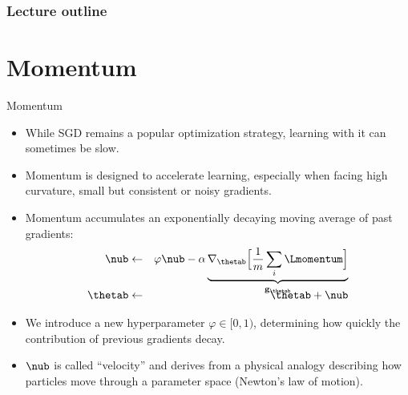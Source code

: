








\begin{frame}
\frametitle{Lecture outline}
\tableofcontents
\end{frame}

\section{Momentum}
\begin{vbframe}{Momentum}
  \begin{itemize}
    \item While SGD remains a popular optimization strategy, learning with it can sometimes be slow. 
    \item Momentum is designed to accelerate learning, especially when facing high curvature, small but consistent or noisy gradients.
    \item Momentum accumulates an exponentially decaying moving average of past gradients:
      \begin{eqnarray*} 
        \nub &\leftarrow& \varphi \nub - \alpha \underbrace{\nabla_{\thetab} \Big[\frac{1}{m} \sum_{i} \Lmomentum \Big]}_{\mathbf{g}_{\thetab}}\\[-0.3cm]
        \thetab &\leftarrow& \thetab + \nub
      \end{eqnarray*}
    \item We introduce a new hyperparameter $\varphi \in [0, 1)$, determining how quickly the contribution of previous gradients decay.
    \item $\nub$ is called \enquote{velocity} and derives from a physical analogy describing how particles move through a parameter space (Newton's law of motion).
  \end{itemize}
\end{vbframe}

